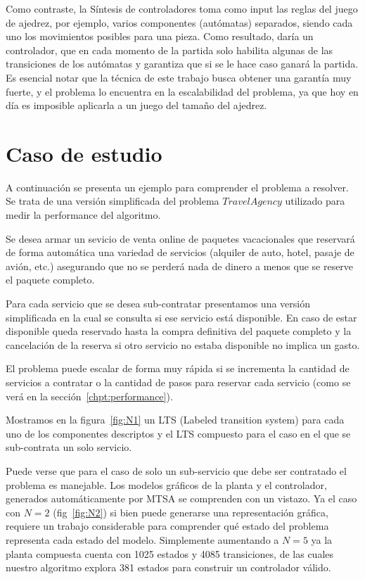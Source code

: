 Como contraste, la Síntesis de controladores toma como input las reglas del juego de ajedrez, por ejemplo, varios componentes (autómatas) separados, siendo cada uno los movimientos posibles para una pieza. Como resultado, daría un controlador, que en cada momento de la partida solo habilita algunas de las transiciones de los autómatas y garantiza que si se le hace caso ganará la partida. Es esencial notar que la técnica de este trabajo busca obtener una garantía muy fuerte, y el problema lo encuentra en la escalabilidad del problema, ya que hoy en día es imposible aplicarla a un juego del tamaño del ajedrez.

\section{Caso de estudio}
A continuación se presenta un ejemplo para comprender el problema a resolver. Se trata de una versión simplificada del problema $Travel Agency$ utilizado para medir la performance del algoritmo.

Se desea armar un sevicio de venta online de paquetes vacacionales que reservará de forma automática una variedad de servicios (alquiler de auto, hotel, pasaje de avión, etc.) asegurando que no se perderá nada de dinero a menos que se reserve el paquete completo.

Para cada servicio que se desea sub-contratar presentamos una versión simplificada en la cual se consulta si ese servicio está disponible. En caso de estar disponible queda reservado hasta la compra definitiva del paquete completo y la cancelación de la reserva si otro servicio no estaba disponible no implica un gasto.

El problema puede escalar de forma muy rápida si se incrementa la cantidad de servicios a contratar o la cantidad de pasos para reservar cada servicio (como se verá en la sección~\ref{chpt:performance}).

Mostramos en la figura~\ref{fig:N1} un LTS (Labeled transition system) para cada uno de los componentes descriptos y el LTS compuesto para el caso en el que se sub-contrata un solo servicio.

Puede verse que para el caso de solo un sub-servicio que debe ser contratado el problema es manejable. Los modelos gráficos de la planta y el controlador, generados automáticamente por MTSA se comprenden con un vistazo. Ya el caso con $N=2$ (fig~\ref{fig:N2}) si bien puede generarse una representación gráfica, requiere un trabajo considerable para comprender qué estado del problema representa cada estado del modelo. Simplemente aumentando a $N=5$ ya la planta compuesta cuenta con 1025 estados y 4085 transiciones, de las cuales nuestro algoritmo explora 381 estados para construir un controlador válido.

